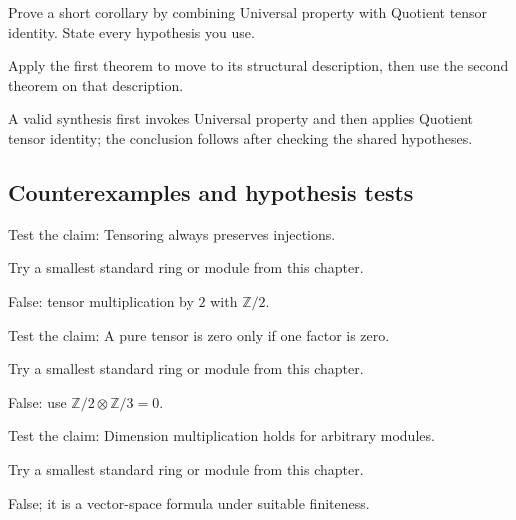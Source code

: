\begin{exercise}\label{exr:v10-expand-09}
Prove a short corollary by combining Universal property with Quotient tensor identity. State every hypothesis you use.
\end{exercise}
\begin{hint}
Apply the first theorem to move to its structural description, then use the second theorem on that description.
\end{hint}
\begin{solution}
A valid synthesis first invokes Universal property and then applies Quotient tensor identity; the conclusion follows after checking the shared hypotheses.
\end{solution}

\subsection*{Counterexamples and hypothesis tests}

\begin{exercise}\label{exr:v10-expand-10}
Test the claim: Tensoring always preserves injections.
\end{exercise}
\begin{hint}
Try a smallest standard ring or module from this chapter.
\end{hint}
\begin{solution}
False: tensor multiplication by $2$ with $\mathbb Z/2$.
\end{solution}

\begin{exercise}\label{exr:v10-expand-11}
Test the claim: A pure tensor is zero only if one factor is zero.
\end{exercise}
\begin{hint}
Try a smallest standard ring or module from this chapter.
\end{hint}
\begin{solution}
False: use $\mathbb Z/2\otimes\mathbb Z/3=0$.
\end{solution}

\begin{exercise}\label{exr:v10-expand-12}
Test the claim: Dimension multiplication holds for arbitrary modules.
\end{exercise}
\begin{hint}
Try a smallest standard ring or module from this chapter.
\end{hint}
\begin{solution}
False; it is a vector-space formula under suitable finiteness.
\end{solution}

